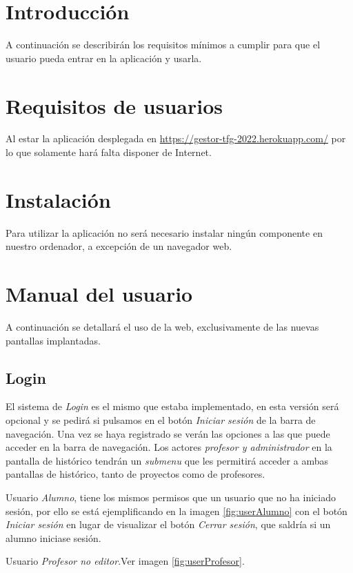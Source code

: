 
\section{Introducción}
A continuación se describirán los requisitos mínimos a cumplir para que el usuario pueda entrar en la aplicación y usarla.

\section{Requisitos de usuarios}
 Al estar la aplicación desplegada en \href{https://gestor-tfg-2022.herokuapp.com/}{https://gestor-tfg-2022.herokuapp.com/} por lo que solamente hará falta disponer de Internet.
\section{Instalación}
Para utilizar la aplicación no será necesario instalar ningún componente en nuestro ordenador, a excepción de un navegador web.
\section{Manual del usuario}
A continuación se detallará el uso de la web, exclusivamente de las nuevas pantallas implantadas.
\subsection{Login}
El sistema de \emph{Login} es el mismo que estaba implementado, en esta versión será opcional y se pedirá si pulsamos en el botón \emph{Iniciar sesión} de la barra de navegación. Una vez se haya registrado se verán las opciones a las que puede acceder en la barra de navegación. Los actores \emph{profesor y administrador} en la pantalla de histórico tendrán un \emph{submenu} que les permitirá acceder a ambas pantallas de histórico, tanto de proyectos como de profesores.

Usuario \emph{Alumno}, tiene los mismos permisos que un usuario que no ha iniciado sesión, por ello se está ejemplificando en la imagen \ref{fig:userAlumno} con el botón \emph{Iniciar sesión} en lugar de visualizar el botón \emph{Cerrar sesión}, que saldría si un alumno iniciase sesión. 
 
 Usuario \emph{Profesor no editor}.Ver imagen \ref{fig:userProfesor}. 
 
